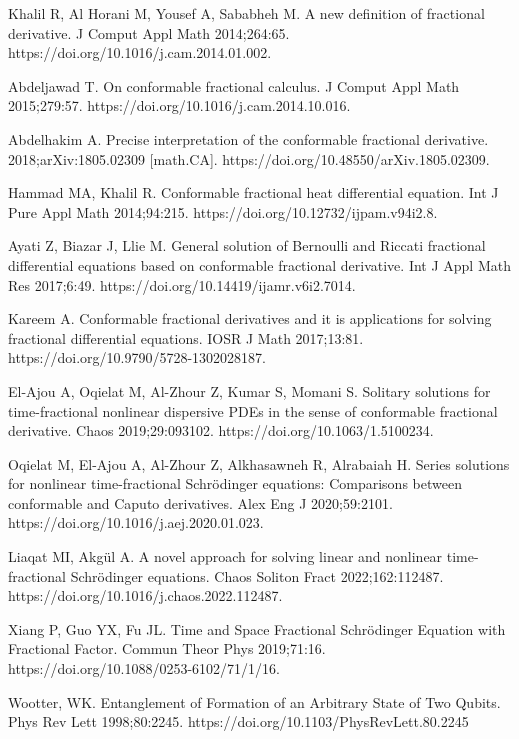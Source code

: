 \documentclass[
showpacs,  %
showkeys,  %
aps,       %
amsthm,    %
amsmath,   %
amsfonts,  %
amssymb    %
]{revtex4-1}          %
\begin{document}
\begin{thebibliography}{}
Khalil R, Al Horani M, Yousef A, Sababheh M. A new definition of fractional derivative. J Comput Appl Math 2014;264:65. https://doi.org/10.1016/j.cam.2014.01.002.

Abdeljawad T. On conformable fractional calculus. J Comput Appl Math 2015;279:57. https://doi.org/10.1016/j.cam.2014.10.016.

Abdelhakim A. Precise interpretation of the conformable fractional derivative. 2018;arXiv:1805.02309 [math.CA]. https://doi.org/10.48550/arXiv.1805.02309.

Hammad MA, Khalil R. Conformable fractional heat differential equation. Int J Pure Appl Math 2014;94:215. https://doi.org/10.12732/ijpam.v94i2.8.

Ayati Z, Biazar J, Llie M. General solution of Bernoulli and Riccati fractional differential equations based on conformable fractional derivative. Int J Appl Math Res 2017;6:49. https://doi.org/10.14419/ijamr.v6i2.7014.

Kareem A. Conformable fractional derivatives and it is applications for solving fractional differential equations. IOSR J Math 2017;13:81. https://doi.org/10.9790/5728-1302028187.

El-Ajou A, Oqielat M, Al-Zhour Z, Kumar S, Momani S. Solitary solutions for time-fractional nonlinear dispersive PDEs in the sense of conformable fractional derivative. Chaos 2019;29:093102. https://doi.org/10.1063/1.5100234.

Oqielat M, El-Ajou A, Al-Zhour Z, Alkhasawneh R, Alrabaiah H. Series solutions for nonlinear time-fractional Schr\"{o}dinger equations: Comparisons between conformable and Caputo derivatives. Alex Eng J 2020;59:2101. https://doi.org/10.1016/j.aej.2020.01.023.

Liaqat MI, Akg\"{u}l A. A novel approach for solving linear and nonlinear time-fractional Schr\"{o}dinger equations. Chaos Soliton Fract 2022;162:112487. https://doi.org/10.1016/j.chaos.2022.112487.

Xiang P, Guo YX, Fu JL. Time and Space Fractional Schr\"{o}dinger Equation with Fractional Factor. Commun Theor Phys 2019;71:16. https://doi.org/10.1088/0253-6102/71/1/16.

Wootter, WK. Entanglement of Formation of an Arbitrary State of Two Qubits. Phys Rev Lett 1998;80:2245. https://doi.org/10.1103/PhysRevLett.80.2245


\end{thebibliography}
\end{document}
